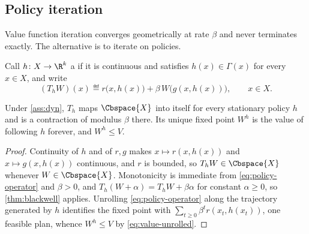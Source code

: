 \subsection{Policy iteration}\label{subsec:dyn-policy-iteration}

Value function iteration converges geometrically at rate $\beta$ and never
terminates exactly. The alternative is to iterate on policies.

Call $h\colon X\to\R^{k}$ a  if it
is continuous and satisfies $h(x)\in\Gamma(x)$ for every $x\in X$, and write
\begin{equation}\label{eq:policy-operator}
	(T_{h}W)(x)\eqdef r\bigl(x,h(x)\bigr)+\beta\,W\bigl(g(x,h(x))\bigr),
	\qquad x\in X .
\end{equation}

\begin{lemma}\label{lem:policy-evaluation}
	Under \autoref{ass:dyn}, $T_{h}$ maps $\Cbspace{X}$ into itself for every
	stationary policy $h$ and is a contraction of modulus $\beta$ there. Its
	unique fixed point $W^{h}$ is the value of following $h$ forever, and
	$W^{h}\leq V$.
\end{lemma}

\begin{proof}
	Continuity of $h$ and of $r,g$ makes $x\mapsto r(x,h(x))$ and
	$x\mapsto g(x,h(x))$ continuous, and $r$ is bounded, so $T_hW\in\Cbspace{X}$
	whenever $W\in\Cbspace{X}$. Monotonicity is immediate from
	\eqref{eq:policy-operator} and $\beta>0$, and
	$T_h(W+\alpha)=T_hW+\beta\alpha$ for constant $\alpha\geq0$, so
	\autoref{thm:blackwell} applies. Unrolling \eqref{eq:policy-operator} along
	the trajectory generated by $h$ identifies the fixed point with
	$\sum_{t\geq0}\beta^{t}r(x_t,h(x_t))$, one feasible plan, whence
	$W^{h}\leq V$ by \eqref{eq:value-unrolled}.
\end{proof}

